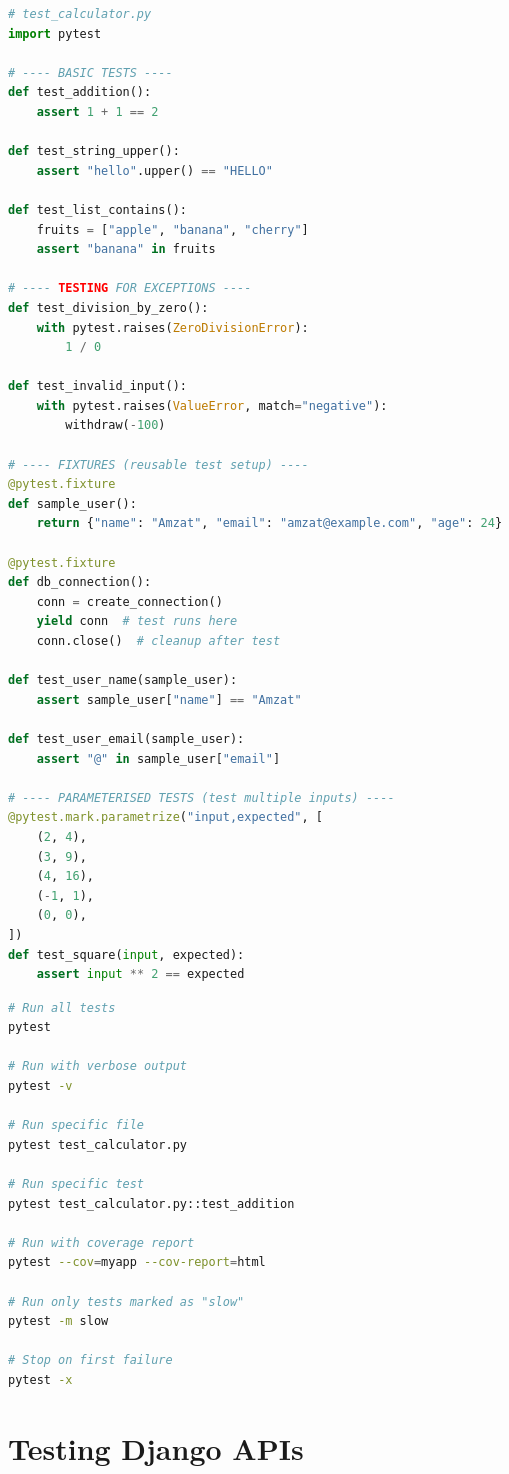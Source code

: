 \documentclass[12pt, a4paper, oneside]{book}
\begin{document}
\begin{lstlisting}[language=Python, caption={pytest essentials}]
# test_calculator.py
import pytest

# ---- BASIC TESTS ----
def test_addition():
    assert 1 + 1 == 2

def test_string_upper():
    assert "hello".upper() == "HELLO"

def test_list_contains():
    fruits = ["apple", "banana", "cherry"]
    assert "banana" in fruits

# ---- TESTING FOR EXCEPTIONS ----
def test_division_by_zero():
    with pytest.raises(ZeroDivisionError):
        1 / 0

def test_invalid_input():
    with pytest.raises(ValueError, match="negative"):
        withdraw(-100)

# ---- FIXTURES (reusable test setup) ----
@pytest.fixture
def sample_user():
    return {"name": "Amzat", "email": "amzat@example.com", "age": 24}

@pytest.fixture
def db_connection():
    conn = create_connection()
    yield conn  # test runs here
    conn.close()  # cleanup after test

def test_user_name(sample_user):
    assert sample_user["name"] == "Amzat"

def test_user_email(sample_user):
    assert "@" in sample_user["email"]

# ---- PARAMETERISED TESTS (test multiple inputs) ----
@pytest.mark.parametrize("input,expected", [
    (2, 4),
    (3, 9),
    (4, 16),
    (-1, 1),
    (0, 0),
])
def test_square(input, expected):
    assert input ** 2 == expected
\end{lstlisting}

\begin{lstlisting}[language=bash, caption={Running pytest}]
# Run all tests
pytest

# Run with verbose output
pytest -v

# Run specific file
pytest test_calculator.py

# Run specific test
pytest test_calculator.py::test_addition

# Run with coverage report
pytest --cov=myapp --cov-report=html

# Run only tests marked as "slow"
pytest -m slow

# Stop on first failure
pytest -x
\end{lstlisting}

\section{Testing Django APIs}
\end{document}
